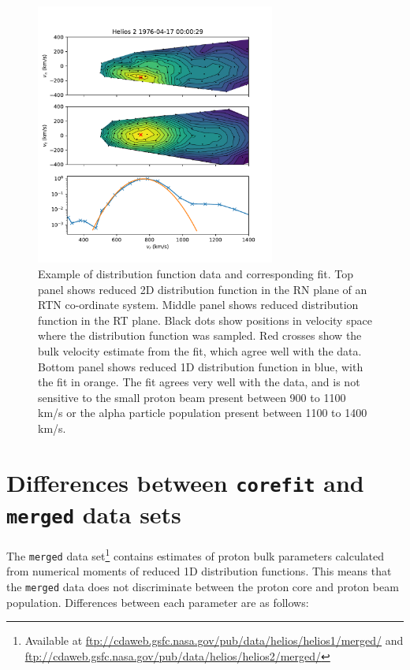 \documentclass[11pt,a4paper]{article}
\begin{document}
\begin{figure}
	\centering
	\includegraphics[width=0.7\textwidth]{I3_3D_example}
	\caption{Example of distribution function data and corresponding fit. Top panel shows reduced 2D distribution function in the RN plane of an RTN co-ordinate system. Middle panel shows reduced distribution function in the RT plane. Black dots show positions in velocity space where the distribution function was sampled. Red crosses show the bulk velocity estimate from the fit, which agree well with the data. Bottom panel shows reduced 1D distribution function in blue, with the fit in orange. The fit agrees very well with the data, and is not sensitive to the small proton beam present between 900 to 1100 km/s or the alpha particle population present between 1100 to 1400 km/s.}
	\label{fig:distribution fit}
\end{figure}

\section{Differences between \texttt{corefit} and \texttt{merged} data sets}
The \texttt{merged} data set\footnote{Available at \url{ftp://cdaweb.gsfc.nasa.gov/pub/data/helios/helios1/merged/} and \url{ftp://cdaweb.gsfc.nasa.gov/pub/data/helios/helios2/merged/}} contains estimates of proton bulk parameters calculated from numerical moments of reduced 1D distribution functions. This means that the \texttt{merged} data does not discriminate between the proton core and proton beam population. Differences between each parameter are as follows:
\end{document}

